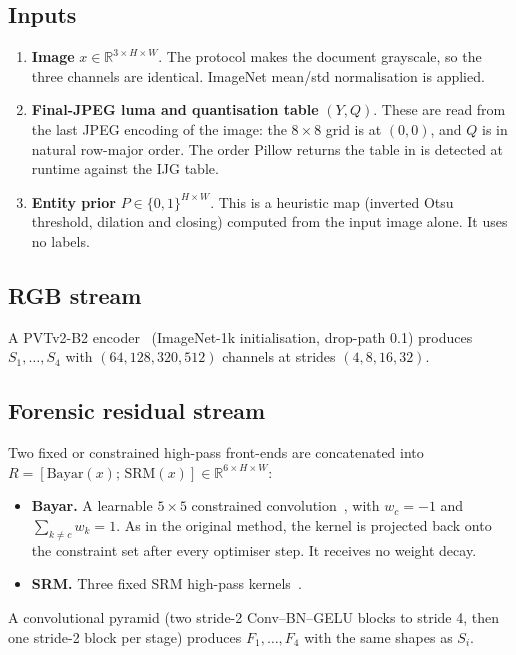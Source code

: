 \documentclass[10pt,a4paper]{article}
\newcommand{\R}{\mathbb{R}}
\begin{document}
\subsection{Inputs}
\begin{enumerate}[label=(\alph*)]
  \item \textbf{Image} $x\in\R^{3\times H\times W}$. The protocol makes the document
        grayscale, so the three channels are identical. ImageNet mean/std normalisation is
        applied.
  \item \textbf{Final-JPEG luma and quantisation table} $(Y, Q)$. These are read from the
        last JPEG encoding of the image: the $8\times8$ grid is at $(0,0)$, and $Q$ is in
        natural row-major order. The order Pillow returns the table in is detected at
        runtime against the IJG table.
  \item \textbf{Entity prior} $P\in\{0,1\}^{H\times W}$. This is a heuristic map
        (inverted Otsu threshold, dilation and closing) computed from the input image
        alone. It uses no labels.
\end{enumerate}

\subsection{RGB stream}
A PVTv2-B2 encoder~\cite{pvtv2} (ImageNet-1k initialisation, drop-path 0.1) produces
$S_1,\dots,S_4$ with $(64,128,320,512)$ channels at strides $(4,8,16,32)$.

\subsection{Forensic residual stream}
Two fixed or constrained high-pass front-ends are concatenated into
$R=[\mathrm{Bayar}(x);\,\mathrm{SRM}(x)]\in\R^{6\times H\times W}$:
\begin{itemize}
  \item \textbf{Bayar.} A learnable $5\times5$ constrained convolution~\cite{bayar}, with
        $w_{c}=-1$ and $\sum_{k\neq c} w_k = 1$. As in the original method, the kernel is
        projected back onto the constraint set after every optimiser step. It receives no
        weight decay.
  \item \textbf{SRM.} Three fixed SRM high-pass kernels~\cite{srm}.
\end{itemize}
A convolutional pyramid (two stride-2 Conv--BN--GELU blocks to stride 4, then one
stride-2 block per stage) produces $F_1,\dots,F_4$ with the same shapes as $S_i$.
\end{document}
